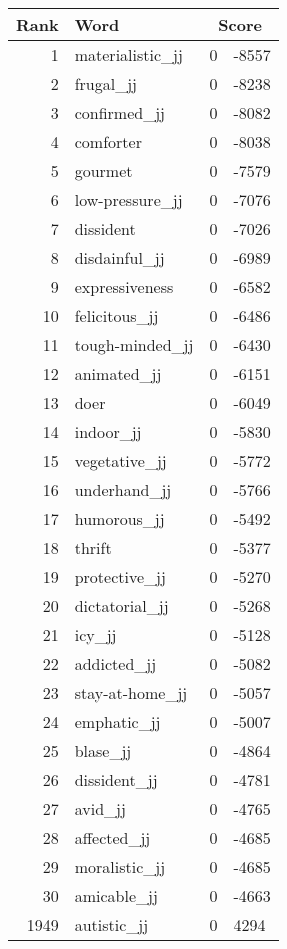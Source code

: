 \begin{longtable}[!htbp]{| rlr@{.}l |}
    \hline
    \textbf{Rank} & \textbf{Word} & \multicolumn{2}{c|}{\textbf{Score}} \\
    \hline
    \endhead
    1 & materialistic\_jj & 0 & -8557 \\
    2 & frugal\_jj & 0 & -8238 \\
    3 & confirmed\_jj & 0 & -8082 \\
    4 & comforter & 0 & -8038 \\
    5 & gourmet & 0 & -7579 \\
    6 & low-pressure\_jj & 0 & -7076 \\
    7 & dissident & 0 & -7026 \\
    8 & disdainful\_jj & 0 & -6989 \\
    9 & expressiveness & 0 & -6582 \\
    10 & felicitous\_jj & 0 & -6486 \\
    11 & tough-minded\_jj & 0 & -6430 \\
    12 & animated\_jj & 0 & -6151 \\
    13 & doer & 0 & -6049 \\
    14 & indoor\_jj & 0 & -5830 \\
    15 & vegetative\_jj & 0 & -5772 \\
    16 & underhand\_jj & 0 & -5766 \\
    17 & humorous\_jj & 0 & -5492 \\
    18 & thrift & 0 & -5377 \\
    19 & protective\_jj & 0 & -5270 \\
    20 & dictatorial\_jj & 0 & -5268 \\
    21 & icy\_jj & 0 & -5128 \\
    22 & addicted\_jj & 0 & -5082 \\
    23 & stay-at-home\_jj & 0 & -5057 \\
    24 & emphatic\_jj & 0 & -5007 \\
    25 & blase\_jj & 0 & -4864 \\
    26 & dissident\_jj & 0 & -4781 \\
    27 & avid\_jj & 0 & -4765 \\
    28 & affected\_jj & 0 & -4685 \\
    29 & moralistic\_jj & 0 & -4685 \\
    30 & amicable\_jj & 0 & -4663 \\
    1949 & autistic\_jj & 0 & 4294 \\

\end{longtable}
